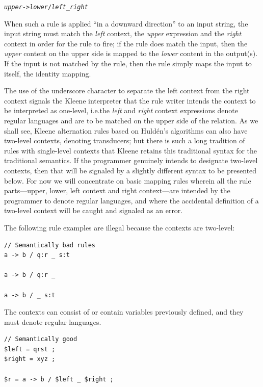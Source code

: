 \begin{alltt}
\emph{upper} -> \emph{lower} / \emph{left} _ \emph{right}
\end{alltt}

\noindent
When such a rule is applied ``in a downward direction'' to an input string, the input string must match the \emph{left}
context, the \emph{upper} expression and the \emph{right} context in order for the rule to fire; if the rule does match the input, then the
\emph{upper} content on the upper side is mapped to the \emph{lower} content in the output(s).  If the
input is not matched by the rule, then the rule simply maps the input to itself, the identity mapping.


The use of the underscore character to separate the left context from the right context signals the
Kleene interpreter that the rule writer intends the context to be interpreted as one-level, i.e.\@ the
\emph{left} and \emph{right} context expressions denote regular languages and are to be matched on the upper
side of the relation.  As we shall see, Kleene alternation rules based on Huldén's algorithms can
also have two-level contexts, denoting transducers; but there is such a long tradition of rules with
single-level contexts that Kleene retains this traditional syntax for the traditional semantics.  If
the programmer genuinely intends to designate two-level contexts, then that will be signaled by a
slightly different syntax to be presented below.  For now we will concentrate on basic mapping rules
wherein all the rule parts---upper, lower, left context and right context---are intended
by the programmer
to denote regular languages, and where the accidental definition of a two-level context will be caught
and signaled as an error.

The following rule examples are illegal because the contexts are two-level:

\begin{Verbatim}
// Semantically bad rules
a -> b / q:r _ s:t

a -> b / q:r _

a -> b / _ s:t
\end{Verbatim}

\noindent
The contexts can consist of or contain variables previously defined, and they must denote regular languages.


\begin{Verbatim}
// Semantically good
$left = qrst ;
$right = xyz ;

$r = a -> b / $left _ $right ;
\end{Verbatim}

